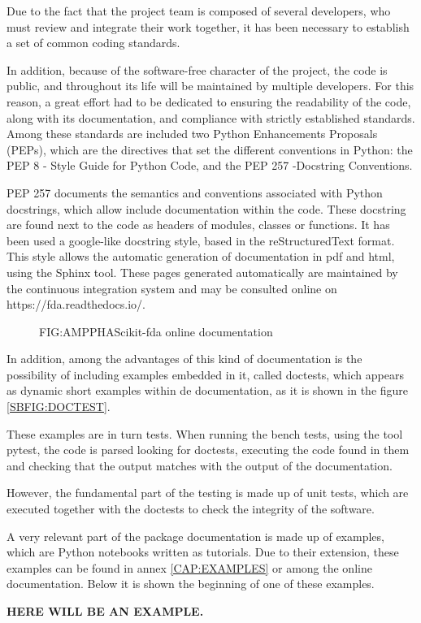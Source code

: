 Due to the fact that the project team is composed of several developers, who
must review and integrate their work together, it has been necessary to
establish a set of common coding standards.

In addition, because of the software-free character of the project, the code is
public, and throughout its life will be maintained by multiple developers. For
this reason, a great effort had to be dedicated to ensuring the readability of
the code, along with its documentation, and compliance with strictly established
standards. Among these standards are included two Python Enhancements Proposals
(PEPs), which are the directives that set the different conventions in Python:
the PEP 8 - Style Guide for Python Code, and the PEP 257 -Docstring Conventions.

PEP 257 documents the semantics and conventions associated with Python
docstrings, which allow include documentation within the code. These docstring
are found next to the code as headers of modules, classes or functions. It has
been used a google-like docstring style, based in the reStructuredText format.
This style allows the automatic generation of documentation in pdf and html,
using the Sphinx tool. These pages generated automatically are maintained by
the continuous integration system and may be consulted online on
https://fda.readthedocs.io/.

\begin{figure}[Scikit-fda online documentation]{FIG:AMPPHA}{Scikit-fda online documentation}
   \quad
\end{figure}

In addition, among the advantages of this kind of documentation is the
possibility of including examples embedded in it, called doctests, which appears
 as dynamic short examples within de documentation, as it is shown in the
 figure \ref{SBFIG:DOCTEST}.

These examples are in turn tests. When running the bench tests, using the tool
pytest, the code is parsed looking for doctests, executing the code found in
them and checking that the output matches with the output of the documentation.

However, the fundamental part of the testing is made up of unit tests, which are
executed together with the doctests to check the integrity of the software.

A very relevant part of the package documentation is made up of examples,
which are Python notebooks written as tutorials. Due to their extension, these
examples can be found in annex \ref{CAP:EXAMPLES} or among the online documentation. Below it is
shown the beginning of one of these examples.

\textbf{HERE WILL BE AN EXAMPLE.}
